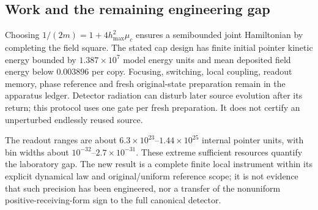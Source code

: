 \subsection{Work and the remaining engineering gap}
Choosing $1/(2m)=1+4h_{\max}^2\mu_c$ ensures a semibounded joint
Hamiltonian by completing the field square.  The stated cap design has
finite initial pointer kinetic energy bounded by
$1.387\times10^7$ model energy units and mean deposited field energy
below $0.003896$ per copy.  Focusing, switching, local coupling,
readout memory, phase reference and fresh original-state preparation
remain in the apparatus ledger.  Detector radiation can disturb later
source evolution after its return; this protocol uses one gate per fresh
preparation.  It does not certify an unperturbed endlessly reused source.

The readout ranges are about $6.3\times10^{23}$--$1.44\times10^{25}$
internal pointer units, with bin widths about $10^{-32}$--$2.7\times10^{-31}$.
These extreme sufficient resources quantify the laboratory gap.  The new
result is a complete finite local instrument within its explicit dynamical
law and original/uniform reference scope; it is not evidence that such
precision has been engineered, nor a transfer of the nonuniform
positive-receiving-form sign to the full canonical detector.
